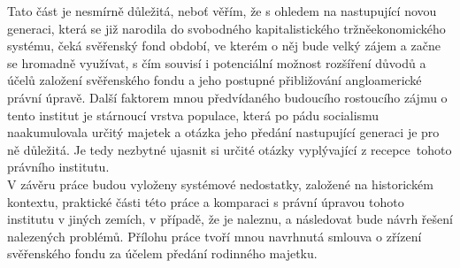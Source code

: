 \documentclass{article}
\begin{document}
\indent Tato část je nesmírně důležitá, neboť věřím, že s ohledem na nastupující novou generaci, která se již narodila do svobodného kapitalistického tržněeko\-nomického systému, čeká svěřenský fond období, ve kterém o něj bude velký zájem a začne se hromadně využívat, s čím souvisí i potenciální možnost rozšíření důvodů a účelů založení svěřenského fondu a jeho postupné přibližování angloamerické právní úpravě. Další faktorem mnou předvídaného budoucího rostoucího zájmu o tento institut je stárnoucí vrstva populace, která po pádu socialismu naakumulovala určitý majetek a otázka jeho předání nastupující generaci je pro ně důležitá. Je tedy nezbytné ujasnit si určité otázky vyplývající z recepce\ tohoto právního institutu. \\

\indent V závěru práce budou vyloženy systémové nedostatky, založené na historickém kontextu, praktické části této práce a komparaci s právní úpravou tohoto institutu v jiných zemích, v případě, že je naleznu, a následovat bude návrh řešení nalezených problémů. Přílohu práce tvoří mnou navrhnutá smlouva o zřízení svěřenského fondu za účelem předání rodinného majetku.




\end{document}

